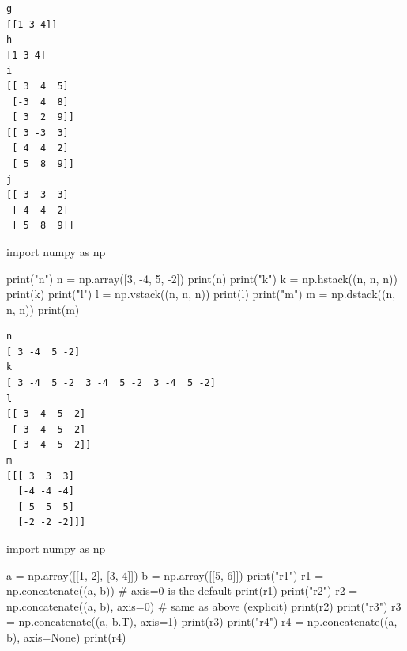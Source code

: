 \documentclass[
  english,
  letterpaper,
  DIV=11,
  numbers=noendperiod]{scrreprt}
\newenvironment{Shaded}{\begin{snugshade}}{\end{snugshade}}
\newcommand{\BuiltInTok}[1]{\textcolor[rgb]{0.00,0.23,0.31}{#1}}
\newcommand{\CommentTok}[1]{\textcolor[rgb]{0.37,0.37,0.37}{#1}}
\newcommand{\DecValTok}[1]{\textcolor[rgb]{0.68,0.00,0.00}{#1}}
\newcommand{\ImportTok}[1]{\textcolor[rgb]{0.00,0.46,0.62}{#1}}
\newcommand{\NormalTok}[1]{\textcolor[rgb]{0.00,0.23,0.31}{#1}}
\newcommand{\OperatorTok}[1]{\textcolor[rgb]{0.37,0.37,0.37}{#1}}
\newcommand{\StringTok}[1]{\textcolor[rgb]{0.13,0.47,0.30}{#1}}
\newcommand{\VariableTok}[1]{\textcolor[rgb]{0.07,0.07,0.07}{#1}}
\begin{document}
\begin{verbatim}
g
[[1 3 4]]
h
[1 3 4]
i
[[ 3  4  5]
 [-3  4  8]
 [ 3  2  9]]
[[ 3 -3  3]
 [ 4  4  2]
 [ 5  8  9]]
j
[[ 3 -3  3]
 [ 4  4  2]
 [ 5  8  9]]
\end{verbatim}

\begin{Shaded}
\begin{Highlighting}[]
\ImportTok{import}\NormalTok{ numpy }\ImportTok{as}\NormalTok{ np}

\BuiltInTok{print}\NormalTok{(}\StringTok{"n"}\NormalTok{)}
\NormalTok{n }\OperatorTok{=}\NormalTok{ np.array([}\DecValTok{3}\NormalTok{, }\OperatorTok{{-}}\DecValTok{4}\NormalTok{, }\DecValTok{5}\NormalTok{, }\OperatorTok{{-}}\DecValTok{2}\NormalTok{])}
\BuiltInTok{print}\NormalTok{(n)}
\BuiltInTok{print}\NormalTok{(}\StringTok{"k"}\NormalTok{)}
\NormalTok{k }\OperatorTok{=}\NormalTok{ np.hstack((n, n, n))}
\BuiltInTok{print}\NormalTok{(k)}
\BuiltInTok{print}\NormalTok{(}\StringTok{"l"}\NormalTok{)}
\NormalTok{l }\OperatorTok{=}\NormalTok{ np.vstack((n, n, n))}
\BuiltInTok{print}\NormalTok{(l)}
\BuiltInTok{print}\NormalTok{(}\StringTok{"m"}\NormalTok{)}
\NormalTok{m }\OperatorTok{=}\NormalTok{ np.dstack((n, n, n))}
\BuiltInTok{print}\NormalTok{(m)}
\end{Highlighting}
\end{Shaded}

\begin{verbatim}
n
[ 3 -4  5 -2]
k
[ 3 -4  5 -2  3 -4  5 -2  3 -4  5 -2]
l
[[ 3 -4  5 -2]
 [ 3 -4  5 -2]
 [ 3 -4  5 -2]]
m
[[[ 3  3  3]
  [-4 -4 -4]
  [ 5  5  5]
  [-2 -2 -2]]]
\end{verbatim}

\begin{Shaded}
\begin{Highlighting}[]
\ImportTok{import}\NormalTok{ numpy }\ImportTok{as}\NormalTok{ np}

\NormalTok{a }\OperatorTok{=}\NormalTok{ np.array([[}\DecValTok{1}\NormalTok{, }\DecValTok{2}\NormalTok{], [}\DecValTok{3}\NormalTok{, }\DecValTok{4}\NormalTok{]])}
\NormalTok{b }\OperatorTok{=}\NormalTok{ np.array([[}\DecValTok{5}\NormalTok{, }\DecValTok{6}\NormalTok{]])}
\BuiltInTok{print}\NormalTok{(}\StringTok{"r1"}\NormalTok{)}
\NormalTok{r1 }\OperatorTok{=}\NormalTok{ np.concatenate((a, b))          }\CommentTok{\# axis=0 is the default}
\BuiltInTok{print}\NormalTok{(r1)}
\BuiltInTok{print}\NormalTok{(}\StringTok{"r2"}\NormalTok{)}
\NormalTok{r2 }\OperatorTok{=}\NormalTok{ np.concatenate((a, b), axis}\OperatorTok{=}\DecValTok{0}\NormalTok{)  }\CommentTok{\# same as above (explicit)}
\BuiltInTok{print}\NormalTok{(r2)}
\BuiltInTok{print}\NormalTok{(}\StringTok{"r3"}\NormalTok{)}
\NormalTok{r3 }\OperatorTok{=}\NormalTok{ np.concatenate((a, b.T), axis}\OperatorTok{=}\DecValTok{1}\NormalTok{)}
\BuiltInTok{print}\NormalTok{(r3)}
\BuiltInTok{print}\NormalTok{(}\StringTok{"r4"}\NormalTok{)}
\NormalTok{r4 }\OperatorTok{=}\NormalTok{ np.concatenate((a, b), axis}\OperatorTok{=}\VariableTok{None}\NormalTok{)}
\BuiltInTok{print}\NormalTok{(r4)}
\end{Highlighting}
\end{Shaded}
\end{document}
